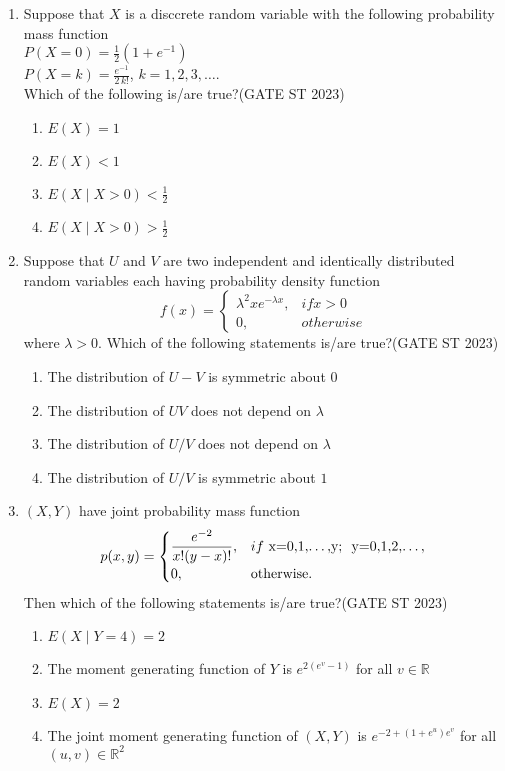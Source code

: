 \documentclass[journal]{IEEEtran}
\begin{document}
\begin{enumerate}[label=\textbf{Q.\arabic*.}, start=1, align=left, itemsep=2em]
\begin{enumerate}[label=\textbf{Q.\arabic*.}, start=11, align=left, itemsep=2em]
\item Suppose that $X$ is a disccrete random variable with the following probability mass function \\

$P(X=0) = \frac12(1 + e^{-1})$ \\

$P(X=k) = \frac{e^{-1}}{2\,k!}$, $k=1,2,3,\dots$. \\

Which of the following is/are true?\hfill(GATE ST 2023)
\begin{enumerate}[label=(\Alph*)]
\item $E(X) = 1$
\item $E(X) < 1$
\item $E(X \mid X > 0) < \frac12$
\item $E(X \mid X > 0) > \frac12$
\end{enumerate}

\item Suppose that $U$ and $V$ are two independent and identically distributed random variables each having probability density function \[
f(x) = \begin{cases}
\lambda^2 x e^{-\lambda x}, & if x>0 \\
0, & otherwise
\end{cases}
\]
where $\lambda >0$. Which of the following statements is/are true?\hfill(GATE ST 2023)
\begin{enumerate}[label=(\Alph*)]
\item The distribution of $U - V$ is symmetric about $0$
\item The distribution of $UV$ does not depend on $\lambda$
\item The distribution of $U/V$ does not depend on $\lambda$
\item The distribution of $U/V$ is symmetric about $1$
\end{enumerate}

\item $(X,Y)$ have joint probability mass function
\[
p(x,y) = \begin{cases}
\dfrac{e^{-2}}{x! (y-x)!}, & if$ x=0,1,\dots,y;~ y=0,1,2,\dots,$ \\
0, & \text{otherwise}.
\end{cases}
\]
Then which of the following statements is/are true?\hfill(GATE ST 2023)
\begin{enumerate}[label=(\Alph*)]
\item $E(X \mid Y=4) = 2$
\item The moment generating function of $Y$ is $e^{2(e^v - 1)}$ for all $v \in \mathbb{R}$
\item $E(X) = 2$
\item The joint moment generating function of $(X,Y)$ is $e^{-2 + (1 + e^u) e^v}$ for all $(u,v)\in \mathbb{R}^2$
\end{enumerate}


\end{enumerate}
\end{enumerate}
\end{document}
